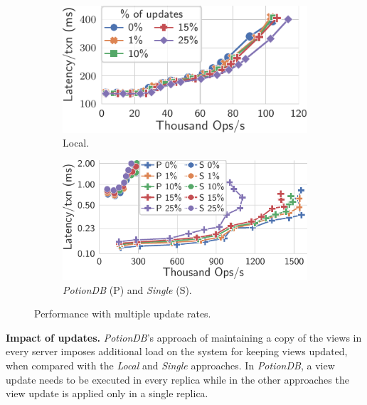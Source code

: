 \documentclass[sigplan,twocolumn,review,anonymous]{acmart}
\begin{document}
\begin{figure}
	\centering
	\begin{subfigure}{.47\linewidth}
		\includegraphics[width=1\linewidth]{singleQuery/upd_rate_local_tc}
	\vspace{-10pt}
		\caption{Local.}
		\label{fig:update_rates_local_tc}
	\end{subfigure}%
	\hspace*{0.2em}
	\begin{subfigure}{.52\linewidth}
		\includegraphics[width=1\linewidth]{singleQuery/upd_rate_tc_global_vs_single}
	\vspace{-10pt}
		\caption{\textit{PotionDB} (P) and \textit{Single} (S).}
		\label{fig:update_rates_global_single_tc}
	\end{subfigure}%
	\vspace{-10pt}
	\caption{Performance with multiple update rates.}
	\label{fig:upds_tc}
	\vspace{-15pt}
\end{figure}


\noindent
\textbf{Impact of updates.}
\textit{PotionDB}'s approach of maintaining a copy of the views in every server imposes additional load on the system
for keeping views updated,  when compared with the \textit{Local} and \textit{Single} approaches. 
In \textit{PotionDB}, a view update needs to be executed in every replica while in the other approaches the view update 
is applied only in a single replica. 
\end{document}
